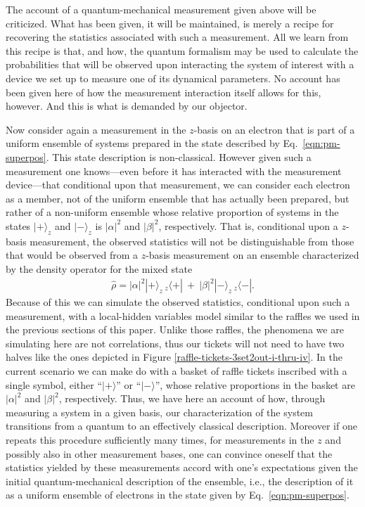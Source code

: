 The account of a quantum-mechanical measurement given above will be criticized. What has been given, it will be maintained, is merely a recipe for recovering the statistics associated with such a measurement. All we learn from this recipe is that, and how, the quantum formalism may be used to calculate the probabilities that will be observed upon interacting the system of interest with a device we set up to measure one of its dynamical parameters. No account has been given here of how the measurement interaction itself allows for this, however. And this is what is demanded by our objector.

Now consider again a measurement in the $z$-basis on an electron that is part of a uniform ensemble of systems prepared in the state described by Eq.\ \eqref{eqn:pm-superpos}. This state description is non-classical. However given such a measurement one knows---even before it has interacted with the measurement device---that conditional upon that measurement, we can consider each electron as a member, not of the uniform ensemble that has actually been prepared, but rather of a non-uniform ensemble whose relative proportion of systems in the states $| + \rangle_{z}$ and $| - \rangle_{z}$ is $|\alpha|^2$ and $|\beta|^2$, respectively. That is, conditional upon a $z$-basis measurement, the observed statistics will not be distinguishable from those that would be observed from a $z$-basis measurement on an ensemble characterized by the density operator for the mixed state
\begin{align}
\label{eqn:mixedstate}
\hat{\rho} = |\alpha|^2| + \rangle_{\!z} \, _{z\!}\langle + | ~+~ |\beta|^2| - \rangle_{\!z} \, _{z\!}\langle - |.
\end{align}
Because of this we can simulate the observed statistics, conditional upon such a measurement, with a local-hidden variables model similar to the raffles we used in the previous sections of this paper. Unlike those raffles, the phenomena we are simulating here are not correlations, thus our tickets will not need to have two halves like the ones depicted in Figure \ref{raffle-tickets-3set2out-i-thru-iv}. In the current scenario we can make do with a basket of raffle tickets inscribed with a single symbol, either ``$|+\rangle$'' or ``$|-\rangle$'', whose relative proportions in the basket are $|\alpha|^2$ and $|\beta|^2$, respectively. Thus, we have here an account of how, through measuring a system in a given basis, our characterization of the system transitions from a quantum to an effectively classical description. Moreover if one repeats this procedure sufficiently many times, for measurements in the $z$ and possibly also in other measurement bases, one can convince oneself that the statistics yielded by these measurements accord with one's expectations given the initial quantum-mechanical description of the ensemble, i.e., the description of it as a uniform ensemble of electrons in the state given by Eq.\ \eqref{eqn:pm-superpos}.

